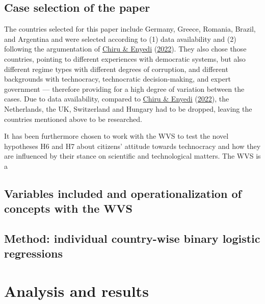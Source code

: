 \documentclass[
  12pt,
  english,
]{article}
\begin{document}
\hypertarget{case-selection-of-the-paper}{%
\subsection{Case selection of the
paper}\label{case-selection-of-the-paper}}

The countries selected for this paper include Germany, Greece, Romania,
Brazil, and Argentina and were selected according to (1) data
availability and (2) following the argumentation of
\protect\hyperlink{ref-chiru2022wants}{Chiru \& Enyedi}
(\protect\hyperlink{ref-chiru2022wants}{2022}). They also chose those
countries, pointing to different experiences with democratic systems,
but also different regime types with different degrees of corruption,
and different backgrounds with technocracy, technocratic
decision-making, and expert government --- therefore providing for a
high degree of variation between the cases. Due to data availability,
compared to \protect\hyperlink{ref-chiru2022wants}{Chiru \& Enyedi}
(\protect\hyperlink{ref-chiru2022wants}{2022}), the Netherlands, the UK,
Switzerland and Hungary had to be dropped, leaving the countries
mentioned above to be researched.

It has been furthermore chosen to work with the WVS to test the novel
hypotheses H6 and H7 about citizens' attitude towards technocracy and
how they are influenced by their stance on scientific and technological
matters. The WVS is a

\hypertarget{variables-included-and-operationalization-of-concepts-with-the-wvs}{%
\subsection{Variables included and operationalization of concepts with
the
WVS}\label{variables-included-and-operationalization-of-concepts-with-the-wvs}}

\hypertarget{method-individual-country-wise-binary-logistic-regressions}{%
\subsection{Method: individual country-wise binary logistic
regressions}\label{method-individual-country-wise-binary-logistic-regressions}}

\hypertarget{analysis-and-results}{%
\section{Analysis and results}\label{analysis-and-results}}
\end{document}
